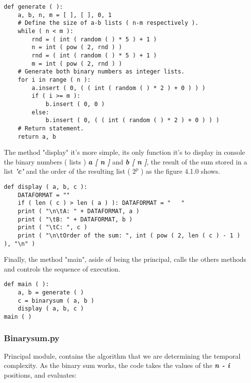 \documentclass[10pt,a4paper]{article}
\begin{document}
\begin{lstlisting}
def generate ( ):
    a, b, n, m = [ ], [ ], 0, 1
    # Define the size of a-b lists ( n-m respectively ).
    while ( n < m ):
        rnd = ( int ( random ( ) * 5 ) + 1 )
        n = int ( pow ( 2, rnd ) )
        rnd = ( int ( random ( ) * 5 ) + 1 )
        m = int ( pow ( 2, rnd ) )
    # Generate both binary numbers as integer lists.
    for i in range ( n ):
        a.insert ( 0, ( ( int ( random ( ) * 2 ) + 0 ) ) )
        if ( i >= m ):
            b.insert ( 0, 0 )
        else:
            b.insert ( 0, ( ( int ( random ( ) * 2 ) + 0 ) ) )
    # Return statement.
    return a, b
\end{lstlisting} \hfill 

The method "display" it's more simple, its only function it's to display in console the binary numbers ( lists ) {\bfseries{\itshape a [ n ]}} and {\bfseries{\itshape b [ n ]}}, the result of the sum stored in a list {\bfseries{\itshape 'c'}} and the order of the resulting list ( $2^p$ ) as the figure 4.1.0 shows. \hfill \break

\begin{lstlisting}
def display ( a, b, c ):
    DATAFORMAT = ""
    if ( len ( c ) > len ( a ) ): DATAFORMAT = "   "
    print ( "\n\tA: " + DATAFORMAT, a )
    print ( "\tB: " + DATAFORMAT, b )
    print ( "\tC: ", c )
    print ( "\n\tOrder of the sum: ", int ( pow ( 2, len ( c ) - 1 ) ), "\n" )
\end{lstlisting} \hfill

Finally, the method "main", aside of being the principal, calls the others methods and controls the sequence of execution. \hfill  \break

\begin{lstlisting}
def main ( ):
    a, b = generate ( )
    c = binarysum ( a, b )
    display ( a, b, c )
main ( )
\end{lstlisting}

\pagebreak

\subsubsection{Binarysum.py}

Principal module, contains the algorithm that we are determining the temporal complexity. As the binary sum works, the code takes the values of the {\bfseries{\itshape n - i}} positions, and evaluates: 
\end{document}

